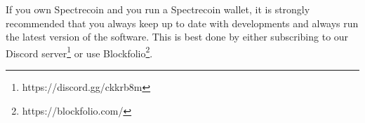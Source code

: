  

If you own Spectrecoin and you run a Spectrecoin wallet, it is strongly recommended that you always keep up to date with developments and always run the latest version of the software. This is best done by either subscribing to our Discord server\footnote{https://discord.gg/ckkrb8m} or use Blockfolio\footnote{https://blockfolio.com/}. 
 